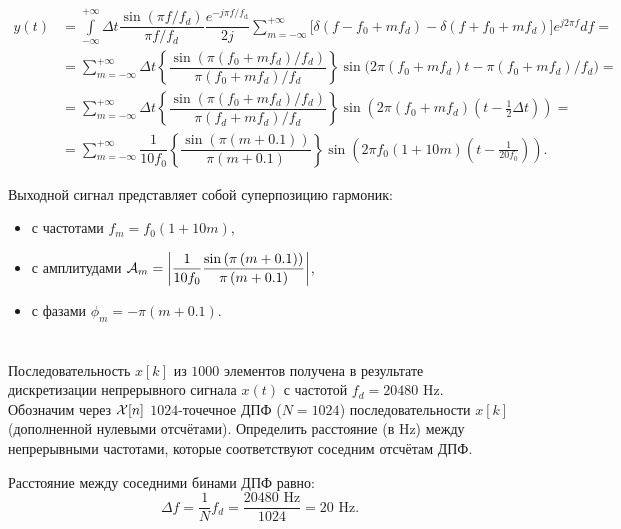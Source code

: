 \begin{align*}
	y(t)&=\int\limits_{-\infty}^{+\infty} \Delta t \dfrac{\sin (\pi f / f_{d})}{\pi f / f_{d}} \dfrac{e^{-j \pi f / f_{\mathrm{d}}}}{2 j} 
	\sum \limits_{m = -\infty}^{+\infty} 
	\big[\delta(f - f_0 + m f_d) - \delta(f + f_0 + m f_d)\big] e^{j 2 \pi f} d f=\\
	&=\sum_{m=-\infty}^{+\infty} \Delta t \left\{\dfrac{\sin \left(\pi\left(f_{0}+m f_{d}\right) / f_{d}\right)}{\pi\left(f_{0} + m f_{d}\right) / f_{d}}\right\}
	\sin \Big(2 \pi\left(f_{0}+m f_{d}\right) t -\pi\left(f_{0}+m f_{d}\right) / f_{d}\Big)=\\
	&=\sum_{m=-\infty}^{+\infty} \Delta t \left\{\dfrac{\sin \left(\pi\left(f_{0} +m f_{d}\right) / f_{d}\right)}{\pi\left(f_{d} + m f_{d}\right) / f_{d}}\right\}
	\sin \left(2 \pi \left(f_0 + m f_d\right) \left(t - \frac{1}{2} \Delta t\right)\right)=\\
	&=\sum_{m=-\infty}^{+\infty} \dfrac{1}{10 f_0} \left\{\dfrac{\sin \left(\pi\left(m + 0.1\right)\right)}{\pi\left(m + 0.1\right)}\right\}
	\sin \left(2 \pi f_0 \left(1 + 10m\right) \left(t - \frac{1}{20f_0}\right)\right).
\end{align*}

Выходной сигнал представляет собой суперпозицию гармоник:
\begin{itemize}
	\item с частотами $f_{m} = f_0 (1 + 10m)$,
	\item с амплитудами $\mathcal{A}_m = \left|\dfrac{1}{10 f_0} \dfrac{\sin \left(\pi\left(m + 0.1\right)\right)}{\pi\left(m + 0.1\right)} \right|$,
	\item с фазами $\phi_m = -\pi (m + 0.1)$.
\end{itemize}



\section{}
Последовательность $x[k]$ из $1000$ элементов получена в результате дискретизации непрерывного сигнала $x(t)$ с частотой $f_d = 20480$ Hz. Обозначим через $\mathcal{X}[n]$ $1024$-точечное ДПФ ($N = 1024$) последовательности $x[k]$ (дополненной нулевыми отсчётами). 
Определить расстояние (в Hz) между непрерывными частотами, которые соответствуют соседним отсчётам ДПФ.

Расстояние между соседними бинами ДПФ равно:
\begin{equation*}
	\Delta f  = \dfrac{1}{N} f_d = \dfrac{20480\text{ Hz}}{1024} = 20\text{ Hz.}
\end{equation*}

